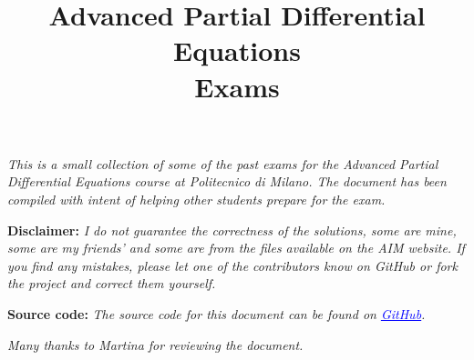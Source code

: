 \documentclass[a4paper,12pt]{article}
\begin{document}
\title{\textbf{Advanced Partial Differential Equations \\ Exams}}
\author{}
\date{}
\maketitle

\noindent\textit{This is a small collection of some of the past exams for the Advanced Partial Differential Equations course 
at Politecnico di Milano. The document has been compiled with intent of helping other students prepare for the exam.}

\vspace{0.5cm}

\textbf{Disclaimer:}
\textit{
I do not guarantee the correctness of the solutions, some are mine, some are my friends' and 
some are from the files available on the AIM website. If you find any mistakes, 
please let one of the contributors know on GitHub or fork the project and correct them yourself.}

\vspace{0.5cm}

\textbf{Source code:}
\textit{
The source code for this document can be found on \href{https://github.com/itsmebonny/APDE_Exams}{\textcolor{blue}{\underline{GitHub}}}.} 
\vspace{0.5cm}

\textit{Many thanks to Martina for reviewing the document.}




\end{document}
